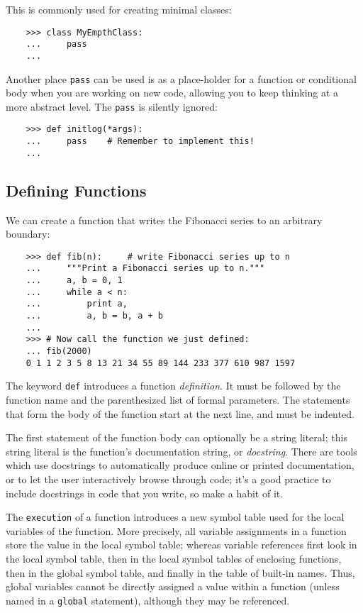 \documentclass[UTF8]{article}
\begin{document}
This is commonly used for creating minimal classes:
\begin{verbatim}
    >>> class MyEmpthClass:
    ...     pass
    ...
\end{verbatim}

Another place \texttt{pass} can be used is as a place-holder for a function or conditional body
when you are working on new code, allowing you to keep thinking at a more abstract level. The
\texttt{pass} is silently ignored:
\begin{verbatim}
    >>> def initlog(*args):
    ...     pass    # Remember to implement this!
    ...
\end{verbatim}

\subsection{Defining Functions}
We can create a function that writes the Fibonacci series to an arbitrary boundary:
\begin{verbatim}
    >>> def fib(n):     # write Fibonacci series up to n
    ...     """Print a Fibonacci series up to n."""
    ...     a, b = 0, 1
    ...     while a < n:
    ...         print a,
    ...         a, b = b, a + b
    ...
    >>> # Now call the function we just defined:
    ... fib(2000)
    0 1 1 2 3 5 8 13 21 34 55 89 144 233 377 610 987 1597
\end{verbatim}

The keyword \texttt{def} introduces a function \emph{definition}. It must be followed by the
function name and the parenthesized list of formal parameters. The statements that form the body of
the function start at the next line, and must be indented.

The first statement of the function body can optionally be a string literal; this string literal is
the function's documentation string, or \emph{docstring}. There are tools which use docstrings to
automatically produce online or printed documentation, or to let the user interactively browse
through code; it's a good practice to include docstrings in code that you write, so make a habit of
it.

The \texttt{execution} of a function introduces a new symbol table used for the local variables of
the function. More precisely, all variable assignments in a function store the value in the local
symbol table; whereas variable references first look in the local symbol table, then in the local
symbol tables of enclosing functions, then in the global symbol table, and finally in the table of
built-in names. Thus, global variables cannot be directly assigned a value within a function
(unless named in a \texttt{global} statement), although they may be referenced.
\end{document}
